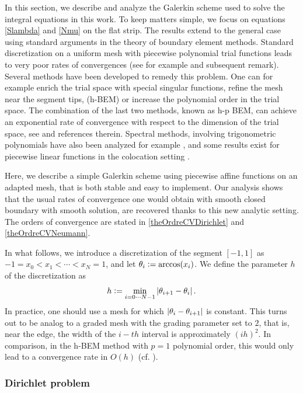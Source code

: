 \documentclass[a4paper]{article}
\begin{document}
In this section, we describe and analyze the Galerkin scheme used to solve the integral equations in this work. To keep matters simple, we focus on equations \eqref{Slambda} and \eqref{Nmu} on the flat strip. The results extend to the general case using standard arguments in the theory of boundary element methods. Standard discretization on a uniform mesh with piecewise polynomial trial functions leads to very poor rates of convergences (see for example \cite[Chap. 4, ]{sauter2011boundary} and subsequent remark). Several methods have been developed to remedy this problem. One can for example enrich the trial space with special singular functions, refine the mesh near the segment tips, (h-BEM) or increase the polynomial order in the trial space. The combination of the last two methods, known as h-p BEM, can achieve an exponential rate of convergence with respect to the dimension of the trial space, see \cite{postell1990h} and references therein. Spectral methods, involving trigonometric polynomials have also been analyzed for example \cite{bruno2012second}, and some results exist for piecewise linear functions in the colocation setting \cite{costabel1988convergence}. 

Here, we describe a simple Galerkin scheme using piecewise affine functions on an adapted mesh, that is both stable and easy to implement. Our analysis shows that the usual rates of convergence one would obtain with smooth closed boundary with smooth solution, are recovered thanks to this new analytic setting. The orders of convergence are stated in \autoref{theOrdreCVDirichlet} and \autoref{theOrdreCVNeumann}. 

In what follows, we introduce a discretization of the segment $[-1,1]$ as $-1 = x_0 < x_1 < \cdots < x_N = 1$, and let $\theta_i \mathrel{\mathop:}= \arccos(x_i)$. We define the parameter $h$ of the discretization as 
\[ h \mathrel{\mathop:}= \min_{i=0\cdots N-1} \left\lvert \theta_{i+1} - \theta_{i} \right\rvert.\]
In practice, one should use a mesh for which $\left\lvert \theta_i - \theta_{i+1} \right\rvert$ is constant. This turns out to be analog to a graded mesh with the grading parameter set to $2$, that is, near the edge, the width of the $i-th$ interval is approximately $(ih)^2$. In comparison, in the h-BEM method with $p=1$ polynomial order, this would only lead to a convergence rate in $O(h)$ (cf. \cite[Theorem 1.3]{postell1990h}).

\subsubsection{Dirichlet problem}
\end{document}
